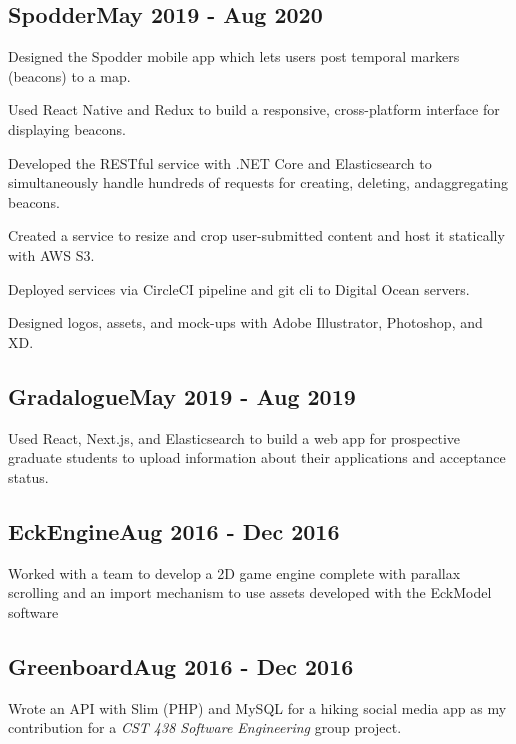 \documentclass[a4paper, 12pt]{article}
\begin{document}
\subsection {{Spodder}\hfill May 2019 - Aug 2020}
\begin{zitemize}
\item Designed the Spodder mobile app which lets users post temporal markers (beacons) to a map.
\item Used React Native and Redux to build a responsive, cross-platform interface for displaying beacons.
\item Developed the RESTful service with .NET Core and Elasticsearch to simultaneously handle hundreds of requests for creating, deleting, andaggregating beacons.
\item Created a service to resize and crop user-submitted content and host it statically with AWS S3.
\item Deployed services via CircleCI pipeline and git cli to Digital Ocean servers.
\item Designed logos, assets, and mock-ups with Adobe Illustrator, Photoshop, and XD\@.
\end{zitemize}

\vspace*{6pt}
\subsection {{Gradalogue}\hfill May 2019 - Aug 2019}
\vspace*{5pt}
Used React, Next.js, and Elasticsearch to build a web app for prospective graduate students to upload information about their applications and acceptance status.

\vspace*{6pt}
\subsection {{EckEngine}\hfill Aug 2016 - Dec 2016}
\vspace*{5pt}
Worked with a team to develop a 2D game engine complete with parallax scrolling and an import mechanism to use assets developed with the EckModel software

\vspace*{6pt}
\subsection {{Greenboard}\hfill Aug 2016 - Dec 2016}
\vspace*{5pt}
Wrote an API with Slim (PHP) and MySQL for a hiking social media app as my contribution for a \textit{CST 438 Software Engineering} group project.
\end{document}
